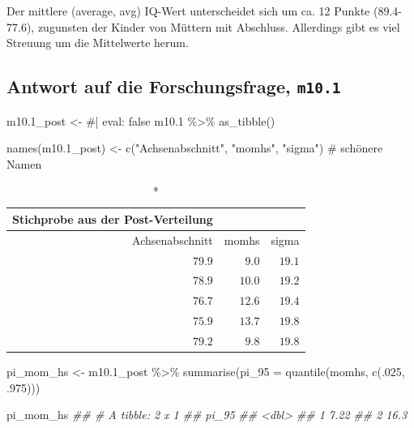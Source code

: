 \documentclass[
  a4paper,
  DIV=11]{scrreprt}
\newenvironment{Shaded}{\begin{snugshade}}{\end{snugshade}}
\newcommand{\AttributeTok}[1]{\textcolor[rgb]{0.40,0.45,0.13}{#1}}
\newcommand{\CommentTok}[1]{\textcolor[rgb]{0.37,0.37,0.37}{#1}}
\newcommand{\DecValTok}[1]{\textcolor[rgb]{0.68,0.00,0.00}{#1}}
\newcommand{\DocumentationTok}[1]{\textcolor[rgb]{0.37,0.37,0.37}{\textit{#1}}}
\newcommand{\FloatTok}[1]{\textcolor[rgb]{0.68,0.00,0.00}{#1}}
\newcommand{\FunctionTok}[1]{\textcolor[rgb]{0.28,0.35,0.67}{#1}}
\newcommand{\NormalTok}[1]{\textcolor[rgb]{0.00,0.23,0.31}{#1}}
\newcommand{\OtherTok}[1]{\textcolor[rgb]{0.00,0.23,0.31}{#1}}
\newcommand{\SpecialCharTok}[1]{\textcolor[rgb]{0.37,0.37,0.37}{#1}}
\newcommand{\StringTok}[1]{\textcolor[rgb]{0.13,0.47,0.30}{#1}}
\theoremstyle{definition}
\theoremstyle{remark}
\begin{document}
Der mittlere (average, avg) IQ-Wert unterscheidet sich um ca. 12 Punkte
(89.4-77.6), zugunsten der Kinder von Müttern mit Abschluss. Allerdings
gibt es viel Streuung um die Mittelwerte herum.

\hypertarget{antwort-auf-die-forschungsfrage-m10.1}{%
\subsection{\texorpdfstring{Antwort auf die Forschungsfrage,
\texttt{m10.1}}{Antwort auf die Forschungsfrage, m10.1}}\label{antwort-auf-die-forschungsfrage-m10.1}}

\begin{Shaded}
\begin{Highlighting}[]
\NormalTok{m10}\FloatTok{.1}\NormalTok{\_post }\OtherTok{\textless{}{-}}
\CommentTok{\#| eval: false}
\NormalTok{  m10}\FloatTok{.1} \SpecialCharTok{\%\textgreater{}\%} 
  \FunctionTok{as\_tibble}\NormalTok{() }

\FunctionTok{names}\NormalTok{(m10}\FloatTok{.1}\NormalTok{\_post) }\OtherTok{\textless{}{-}} \FunctionTok{c}\NormalTok{(}\StringTok{"Achsenabschnitt"}\NormalTok{, }\StringTok{"momhs"}\NormalTok{, }\StringTok{"sigma"}\NormalTok{)  }\CommentTok{\# schönere Namen}
\end{Highlighting}
\end{Shaded}

\begin{longtable}{rrr}
\caption*{
{\large Stichprobe aus der Post-Verteilung}
} \\ 
\toprule
Achsenabschnitt & momhs & sigma \\ 
\midrule
$79.9$ & $9.0$ & $19.1$ \\ 
$78.9$ & $10.0$ & $19.2$ \\ 
$76.7$ & $12.6$ & $19.4$ \\ 
$75.9$ & $13.7$ & $19.8$ \\ 
$79.2$ & $9.8$ & $19.8$ \\ 
\bottomrule
\end{longtable}

\begin{Shaded}
\begin{Highlighting}[]
\NormalTok{pi\_mom\_hs }\OtherTok{\textless{}{-}}
\NormalTok{  m10}\FloatTok{.1}\NormalTok{\_post }\SpecialCharTok{\%\textgreater{}\%} 
  \FunctionTok{summarise}\NormalTok{(}\AttributeTok{pi\_95 =} \FunctionTok{quantile}\NormalTok{(momhs, }\FunctionTok{c}\NormalTok{(.}\DecValTok{025}\NormalTok{, .}\DecValTok{975}\NormalTok{)))}

\NormalTok{pi\_mom\_hs}
\DocumentationTok{\#\# \# A tibble: 2 x 1}
\DocumentationTok{\#\#   pi\_95}
\DocumentationTok{\#\#   \textless{}dbl\textgreater{}}
\DocumentationTok{\#\# 1  7.22}
\DocumentationTok{\#\# 2 16.3}
\end{Highlighting}
\end{Shaded}
\end{document}
